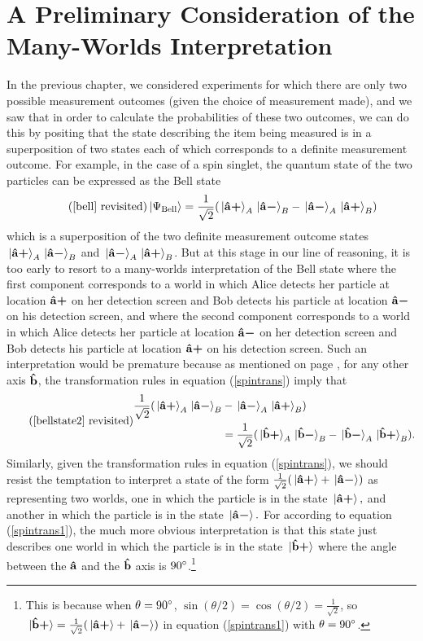 \section{A Preliminary Consideration of the Many-Worlds Interpretation}
     In the previous chapter, we considered experiments for which there are only two possible measurement outcomes (given the choice of measurement made), and we saw that in order to calculate the probabilities of these two outcomes, we can do this by positing that the state describing the item being measured is in a superposition of two states each of which corresponds to a definite measurement outcome. For example, in the case of a spin singlet, the quantum state of the two particles can be expressed as the Bell state
     \begin{equation}\tag{\ref{bell} revisited}          
          \ket*{\Psi_{\text{Bell}}}=\frac{1}{\sqrt{2}}(\ket*{\uvbp{a}}_A\ket*{\uvbm{a}}_B-\ket*{\uvbm{a}}_A\ket*{\uvbp{a}}_B) 
      \end{equation}
     which is a superposition of the two definite measurement outcome states  $\ket*{{\vb{\hat{{a}}}\bm{+}}}_A\ket*{{\vb{\hat{{a}}}\bm{-}}}_B$ and $\ket*{{\vb{\hat{{a}}}\bm{-}}}_A\ket*{{\vb{\hat{{a}}}\bm{+}}}_B$.
    But at this stage in our line of reasoning, it is too early to resort to a many-worlds interpretation of the Bell state where  the first component corresponds to a world in which Alice detects her particle at location ${\vb{\hat{{a}}}\bm{+}}$ on her detection screen and Bob detects his particle at location ${\vb{\hat{{a}}}\bm{-}}$ on his detection screen, and where the second component corresponds to a world in which Alice detects her particle at location ${\vb{\hat{{a}}}\bm{-}}$ on her detection screen and Bob detects his particle at location ${\vb{\hat{{a}}}\bm{+}}$ on his detection screen. Such an interpretation would be premature because as mentioned on page \pageref{bellstate2}, for any other axis $\vb{\hat{{b}}}$, the transformation rules in equation (\ref{spintrans}) imply that  
    \begin{equation*}\tag{\ref{bellstate2} revisited}
     \begin{split}
     \frac{1}{\sqrt{2}}(\ket*{\uvbp{a}}_A\ket*{\uvbm{a}}_B&-\ket*{\uvbm{a}}_A\ket*{\uvbp{a}}_B)\\
     &=\frac{1}{\sqrt{2}}(\ket*{\uvbp{b}}_A\ket*{\uvbm{b}}_B-\ket*{\uvbm{b}}_A\ket*{\uvbp{b}}_B).
\end{split}
\end{equation*}
    Similarly, given the transformation rules in equation (\ref{spintrans}), we should resist the temptation  to interpret a state of the form $\frac{1}{\sqrt{2}}(\ket*{{\vb{\hat{{a}}}\bm{+}}}+\ket*{{\vb{\hat{{a}}}\bm{-}}})$ as representing two worlds, one in which the particle is in the state $\ket*{{\vb{\hat{{a}}}\bm{+}}},$ and another in which the particle is in the state $\ket*{{\vb{\hat{{a}}}\bm{-}}}.$ For according to equation (\ref{spintrans1}), the much more obvious interpretation is that this state just describes one world in which the particle is in the state $\ket*{{\vb{\hat{{b}}}\bm{+}}}$ where the angle between
     the $\vb{\hat{{a}}}$ and the  $\vb{\hat{{b}}}$ axis is $90\degree$.\footnote{This is because when $\theta=90\degree$, $\sin(\theta/2)=\cos(\theta/2)=\frac{1}{\sqrt{2}}$, so  $\ket*{{\vb{\hat{{b}}}\bm{+}}}= \frac{1}{\sqrt{2}}(\ket*{{\vb{\hat{{a}}}\bm{+}}}+\ket*{{\vb{\hat{{a}}}\bm{-}}})$ in equation (\ref{spintrans1}) with $\theta=90\degree$. } 
     
